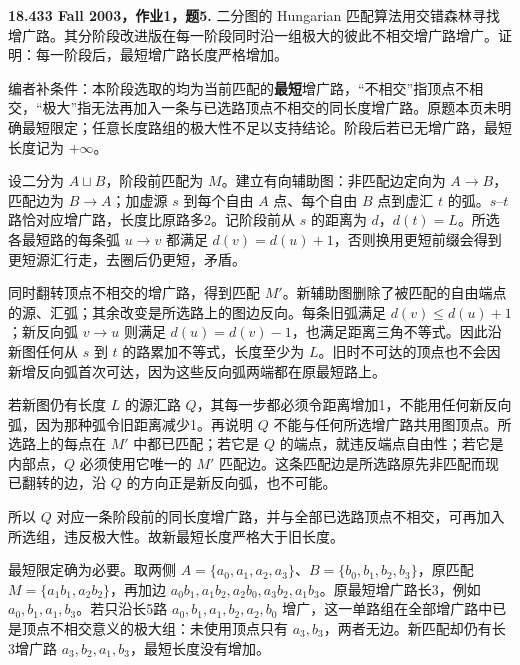 \begin{exercise}\label{mit:18433-a1-q5}
\textbf{18.433 Fall 2003，作业1，题5.}
二分图的 Hungarian 匹配算法用交错森林寻找增广路。其分阶段改进版在每一阶段同时沿一组极大的彼此不相交增广路增广。证明：每一阶段后，最短增广路长度严格增加。

编者补条件：本阶段选取的均为当前匹配的\textbf{最短}增广路，“不相交”指顶点不相交，“极大”指无法再加入一条与已选路顶点不相交的同长度增广路。原题本页未明确最短限定；任意长度路组的极大性不足以支持结论。阶段后若已无增广路，最短长度记为 $+\infty$。
\end{exercise}
\begin{solution}
设二分为 $A\sqcup B$，阶段前匹配为 $M$。建立有向辅助图：非匹配边定向为 $A\to B$，匹配边为 $B\to A$；加虚源 $s$ 到每个自由 $A$ 点、每个自由 $B$ 点到虚汇 $t$ 的弧。$s$--$t$ 路恰对应增广路，长度比原路多2。记阶段前从 $s$ 的距离为 $d$，$d(t)=L$。所选各最短路的每条弧 $u\to v$ 都满足 $d(v)=d(u)+1$，否则换用更短前缀会得到更短源汇行走，去圈后仍更短，矛盾。

同时翻转顶点不相交的增广路，得到匹配 $M'$。新辅助图删除了被匹配的自由端点的源、汇弧；其余改变是所选路上的图边反向。每条旧弧满足 $d(v)\le d(u)+1$；新反向弧 $v\to u$ 则满足 $d(u)=d(v)-1$，也满足距离三角不等式。因此沿新图任何从 $s$ 到 $t$ 的路累加不等式，长度至少为 $L$。旧时不可达的顶点也不会因新增反向弧首次可达，因为这些反向弧两端都在原最短路上。

若新图仍有长度 $L$ 的源汇路 $Q$，其每一步都必须令距离增加1，不能用任何新反向弧，因为那种弧令旧距离减少1。再说明 $Q$ 不能与任何所选增广路共用图顶点。所选路上的每点在 $M'$ 中都已匹配；若它是 $Q$ 的端点，就违反端点自由性；若它是内部点，$Q$ 必须使用它唯一的 $M'$ 匹配边。这条匹配边是所选路原先非匹配而现已翻转的边，沿 $Q$ 的方向正是新反向弧，也不可能。

所以 $Q$ 对应一条阶段前的同长度增广路，并与全部已选路顶点不相交，可再加入所选组，违反极大性。故新最短长度严格大于旧长度。

最短限定确为必要。取两侧 $A=\{a_0,a_1,a_2,a_3\}$、$B=\{b_0,b_1,b_2,b_3\}$，原匹配 $M=\{a_1b_1,a_2b_2\}$，再加边 $a_0b_1,a_1b_2,a_2b_0,a_3b_2,a_1b_3$。原最短增广路长3，例如 $a_0,b_1,a_1,b_3$。若只沿长5路 $a_0,b_1,a_1,b_2,a_2,b_0$ 增广，这一单路组在全部增广路中已是顶点不相交意义的极大组：未使用顶点只有 $a_3,b_3$，两者无边。新匹配却仍有长3增广路 $a_3,b_2,a_1,b_3$，最短长度没有增加。
\end{solution}

